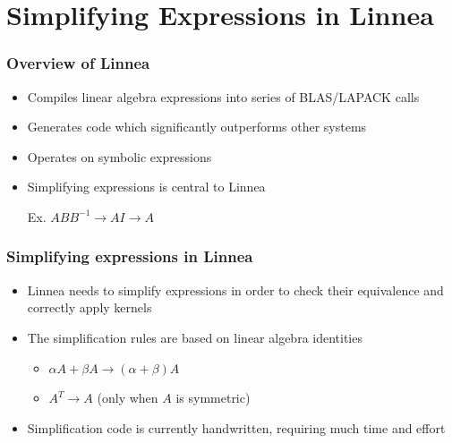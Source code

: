 \documentclass{beamer}
\begin{document}
\section{Simplifying Expressions in Linnea}
\begin{frame}
  \frametitle{Overview of Linnea}
  \begin{itemize}
  \item Compiles linear algebra expressions into series of BLAS/LAPACK calls
  \item Generates code which significantly outperforms other systems
  \item Operates on symbolic expressions
  \begin{center}
\end{center}
\item Simplifying expressions is central to Linnea

  Ex. $ABB^{-1} \to AI \to A$
\end{itemize}
\end{frame}

\begin{frame}
  \frametitle{Simplifying expressions in Linnea}
  \begin{itemize}
  \item Linnea needs to simplify expressions in order to check their equivalence and correctly apply kernels
  \item The simplification rules are based on linear algebra identities
    \begin{itemize}
    \item $\alpha A + \beta A \to (\alpha + \beta) A$
    \item $A^T \to A$ (only when $A$ is symmetric)
    \end{itemize}
  \item Simplification code is currently handwritten, requiring much time and effort
  \end{itemize}
\end{frame}
\end{document}

